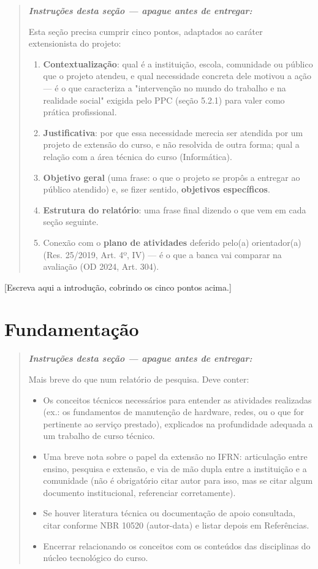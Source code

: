 \documentclass[article,12pt,a4paper,oneside]{abntex2}
\newenvironment{instrucoes}{%
  \begin{quotation}\footnotesize\itshape
  \noindent\textbf{\upshape Instruções desta seção — apague antes de entregar:}\par\smallskip
}{%
  \end{quotation}
}
\begin{document}
\begin{instrucoes}
Esta seção precisa cumprir cinco pontos, adaptados ao caráter extensionista do projeto:
\begin{enumerate}
  \item \textbf{Contextualização}: qual é a instituição, escola, comunidade ou público que o projeto atendeu, e qual necessidade concreta dele motivou a ação — é o que caracteriza a "intervenção no mundo do trabalho e na realidade social" exigida pelo PPC (seção 5.2.1) para valer como prática profissional.
  \item \textbf{Justificativa}: por que essa necessidade merecia ser atendida por um projeto de extensão do curso, e não resolvida de outra forma; qual a relação com a área técnica do curso (Informática).
  \item \textbf{Objetivo geral} (uma frase: o que o projeto se propôs a entregar ao público atendido) e, se fizer sentido, \textbf{objetivos específicos}.
  \item \textbf{Estrutura do relatório}: uma frase final dizendo o que vem em cada seção seguinte.
  \item Conexão com o \textbf{plano de atividades} deferido pelo(a) orientador(a) (Res. 25/2019, Art. 4º, IV) — é o que a banca vai comparar na avaliação (OD 2024, Art. 304).
\end{enumerate}
\end{instrucoes}

[Escreva aqui a introdução, cobrindo os cinco pontos acima.]

\section{Fundamentação}

\begin{instrucoes}
Mais breve do que num relatório de pesquisa. Deve conter:
\begin{itemize}
  \item Os conceitos técnicos necessários para entender as atividades realizadas (ex.: os fundamentos de manutenção de hardware, redes, ou o que for pertinente ao serviço prestado), explicados na profundidade adequada a um trabalho de curso técnico.
  \item Uma breve nota sobre o papel da extensão no IFRN: articulação entre ensino, pesquisa e extensão, e via de mão dupla entre a instituição e a comunidade (não é obrigatório citar autor para isso, mas se citar algum documento institucional, referenciar corretamente).
  \item Se houver literatura técnica ou documentação de apoio consultada, citar conforme NBR 10520 (autor-data) e listar depois em Referências.
  \item Encerrar relacionando os conceitos com os conteúdos das disciplinas do núcleo tecnológico do curso.
\end{itemize}
\end{instrucoes}
\end{document}

